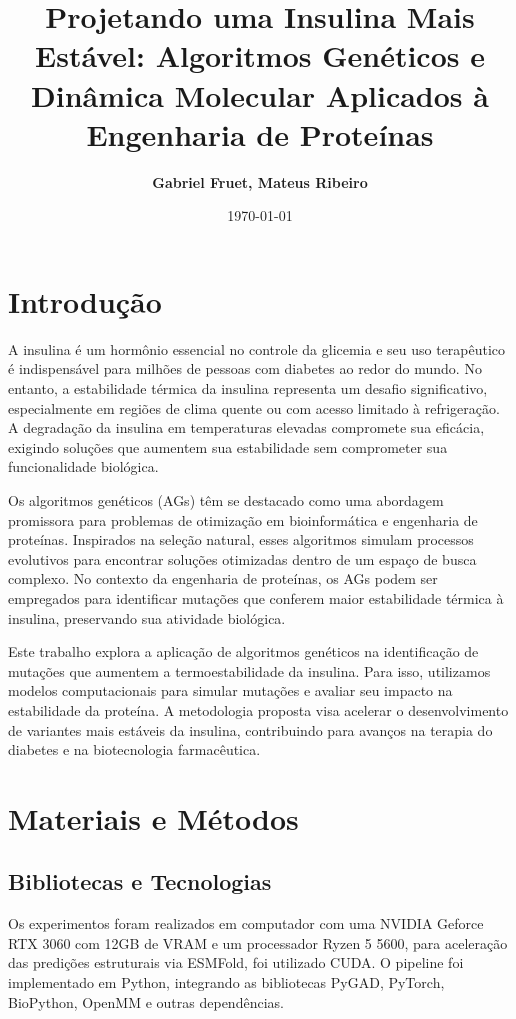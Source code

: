 \documentclass[12pt]{extarticle}
\title{\textbf{Projetando uma Insulina Mais Estável: Algoritmos Genéticos e Dinâmica Molecular Aplicados à Engenharia de Proteínas}}
\author{\textbf{Gabriel Fruet, Mateus Ribeiro }}
\date{\today}
\begin{document}
\maketitle	

\section{Introdução}

A insulina é um hormônio essencial no controle da glicemia e seu uso
terapêutico é indispensável para milhões de pessoas com diabetes ao redor do
mundo. No entanto, a estabilidade térmica da insulina representa um desafio
significativo, especialmente em regiões de clima quente ou com acesso limitado
à refrigeração. A degradação da insulina em temperaturas elevadas compromete
sua eficácia, exigindo soluções que aumentem sua estabilidade sem comprometer
sua funcionalidade biológica.  

Os algoritmos genéticos (AGs) têm se destacado como uma abordagem promissora
para problemas de otimização em bioinformática e engenharia de proteínas.
Inspirados na seleção natural, esses algoritmos simulam processos evolutivos
para encontrar soluções otimizadas dentro de um espaço de busca complexo. No
contexto da engenharia de proteínas, os AGs podem ser empregados para
identificar mutações que conferem maior estabilidade térmica à insulina,
preservando sua atividade biológica.  

Este trabalho explora a aplicação de algoritmos genéticos na identificação de
mutações que aumentem a termoestabilidade da insulina. Para isso, utilizamos
modelos computacionais para simular mutações e avaliar seu impacto na
estabilidade da proteína. A metodologia proposta visa acelerar o
desenvolvimento de variantes mais estáveis da insulina, contribuindo para
avanços na terapia do diabetes e na biotecnologia farmacêutica.  

\section{Materiais e Métodos}

\subsection{Bibliotecas e Tecnologias}

Os experimentos foram realizados em computador com uma NVIDIA Geforce RTX 3060
com 12GB de VRAM e um processador Ryzen 5 5600, para aceleração
das predições estruturais via ESMFold, foi utilizado CUDA. O pipeline foi implementado em Python,
integrando as bibliotecas PyGAD, PyTorch, BioPython, OpenMM e outras dependências.
\end{document}
